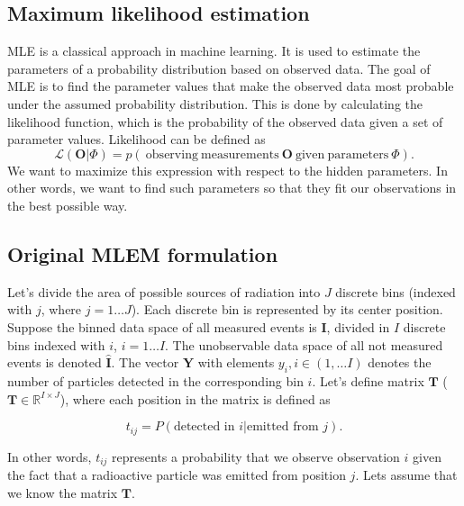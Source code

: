 \subsection{Maximum likelihood estimation}
\ac{MLE} is a classical approach in machine learning.
It is used to estimate the parameters of a probability distribution based on observed data. 
The goal of \ac{MLE} is to find the parameter values that make the observed data most probable under the assumed probability distribution.
This is done by calculating the likelihood function, which is the probability of the observed data given a set of parameter values.
Likelihood can be defined as 
\begin{equation}
  \mathcal{L}(\boldsymbol{O}| \Phi) = p(\ \mathrm{observing\ measurements} \  \boldsymbol{O} \ \mathrm{given\ parameters\ } \Phi ).
  \label{eq:likelihood}
\end{equation}
We want to maximize this expression with respect to the hidden parameters.
In other words, we want to find such parameters so that they fit our observations in the best possible way.

\subsection{Original MLEM formulation}
Let's divide the area of possible sources of radiation into $J$ discrete bins (indexed with $j$, where $j = 1 \dotsc J$).
Each discrete bin is represented by its center position.
Suppose the binned data space of all measured events is $\mathbf{I}$, divided in $I$ discrete bins indexed with $i$, $i = 1 \dotsc I$.
The unobservable data space of all not measured events is denoted $\mathbf{\hat{I}}$.
The vector $\mathbf{Y}$ with elements $y_{i}, i \in (1, \dots I)$ denotes the number of particles detected in the corresponding bin $i$.
Let's define matrix $\mathbf{T}$ ($\mathbf{T} \in \mathbb{R}^{I \times J}$), where each position in the matrix is defined as

\begin{equation}
  t_{ij} =  P(\textrm{detected in } i | \textrm{emitted from } j).
\end{equation}

In other words, $t_{ij}$ represents a probability that we observe observation $i$ given the fact that a radioactive particle was emitted from position $j$.
Lets assume that we know the matrix $\mathbf{T}$.

